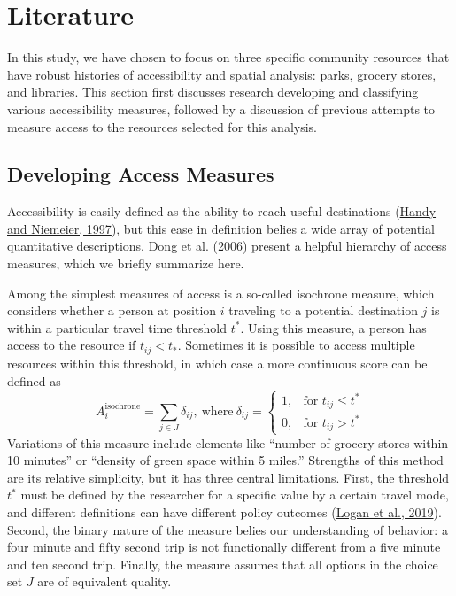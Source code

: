 \documentclass[3p, authoryear, review]{elsarticle} %
\begin{document}
\hypertarget{lit-review}{%
\section{Literature}\label{lit-review}}

In this study, we have chosen to focus on three specific community resources
that have robust histories of accessibility and spatial analysis: parks, grocery
stores, and libraries. This section first discusses research developing and
classifying various accessibility measures, followed by a discussion of previous
attempts to measure access to the resources selected for this analysis.

\hypertarget{developing-access-measures}{%
\subsection{Developing Access Measures}\label{developing-access-measures}}

Accessibility is easily defined as the ability to reach useful destinations (\protect\hyperlink{ref-handy1997}{Handy and Niemeier, 1997}),
but this ease in definition belies a wide array of potential quantitative
descriptions. \protect\hyperlink{ref-dong2006}{Dong et al.} (\protect\hyperlink{ref-dong2006}{2006}) present a helpful hierarchy of access measures, which we
briefly summarize here.

Among the simplest measures of access is a so-called isochrone measure, which
considers whether a person at position \(i\) traveling to a potential destination
\(j\) is within a particular travel time threshold \(t^*\). Using this measure, a
person has access to the resource if \(t_{ij} < t_*\). Sometimes it is
possible to access multiple resources within this threshold, in which case a
more continuous score can be defined as
\begin{equation}
  A_i^{\mathrm{isochrone}} = \sum_{j \in J} \delta_{ij}, 
  \mathrm{\ where\ } \delta_{ij} = 
  \begin{cases}
    1, & \text{for } t_{ij} \leq t^*\\
    0, & \text{for } t_{ij} > t^*
  \end{cases} 
  \label{eq:isochrone}
\end{equation}
Variations of this measure include elements like ``number of grocery stores
within 10 minutes'' or ``density of green space within 5 miles.'' Strengths of
this method are its relative simplicity, but it has three central limitations. First,
the threshold \(t^*\) must be defined by the researcher for a specific value by
a certain travel mode, and different definitions
can have different policy outcomes (\protect\hyperlink{ref-logan2019}{Logan et al., 2019}). Second, the binary nature of the
measure belies our understanding of behavior: a four minute and fifty second
trip is not functionally different from a five minute and ten second trip. Finally,
the measure assumes that all options in the choice set \(J\) are of equivalent
quality.
\end{document}
